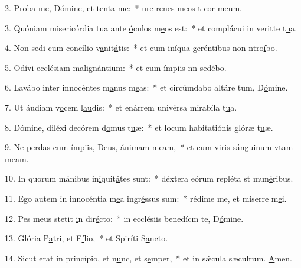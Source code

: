 2. Proba me, Dómin\uline{e}, et t\uline{e}nta me:~* ure renes meos t cor m\uline{e}um.\par 
3. Quóniam misericórdia tua ante \uline{ó}culos m\uline{e}os est:~* et complácui in veritte t\uline{u}a.\par 
4. Non sedi cum concílio v\uline{a}nit\uline{á}tis:~* et cum iníqua geréntibus non ntro\uline{í}bo.\par 
5. Odívi ecclésiam m\uline{a}lign\uline{á}ntium:~* et cum ímpiis nn sed\uline{é}bo.\par 
6. Lavábo inter innocéntes m\uline{a}nus m\uline{e}as:~* et circúmdabo altáre tum, D\uline{ó}mine.\par 
7. Ut áudiam v\uline{o}cem l\uline{au}dis:~* et enárrem univérsa mirabíla t\uline{u}a.\par 
8. Dómine, diléxi decórem d\uline{o}mus t\uline{u}æ:~* et locum habitatiónis glóræ t\uline{u}æ.\par 
9. Ne perdas cum ímpiis, Deus, \uline{á}nimam m\uline{e}am,~* et cum viris sánguinum vtam m\uline{e}am.\par 
10. In quorum mánibus in\uline{i}quit\uline{á}tes sunt:~* déxtera eórum repléta st mun\uline{é}ribus.\par 
11. Ego autem in innocéntia m\uline{e}a ingr\uline{é}ssus sum:~* rédime me, et miserre m\uline{e}i.\par 
12. Pes meus stetit \uline{i}n dir\uline{é}cto:~* in ecclésiis benedícm te, D\uline{ó}mine.\par 
13. Glória P\uline{a}tri, et F\uline{í}lio,~* et Spiríti S\uline{a}ncto.\par 
14. Sicut erat in princípio, et n\uline{u}nc, et s\uline{e}mper,~* et in sǽcula sæculrum. \uline{A}men.\par 
